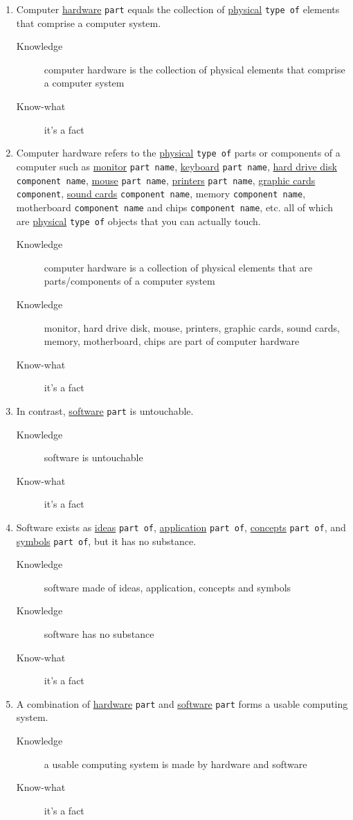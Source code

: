 \documentclass[a4paper,10pt,twoside,twocolumn]{article}
\begin{document}
\begin{enumerate}
\item Computer \uline{hardware} \texttt{part} equals the collection of \uline{physical} \texttt{type of} elements that comprise a computer system.
\begin{description}
\item[{Knowledge}] computer hardware is the collection of physical elements that comprise a computer system
\item[{Know-what}] it's a fact
\end{description}
\item Computer hardware refers to the \uline{physical} \texttt{type of} parts or components of a computer such as \uline{monitor} \texttt{part name}, \uline{keyboard} \texttt{part name}, \uline{hard drive disk} \texttt{component name}, \uline{mouse} \texttt{part name}, \uline{printers} \texttt{part name}, \uline{graphic cards} \texttt{component}, \uline{sound cards} \texttt{component name}, memory \texttt{component name}, motherboard \texttt{component name} and chips \texttt{component name}, etc. all of which are \uline{physical} \texttt{type of} objects that you can actually touch.
\begin{description}
\item[{Knowledge}] computer hardware is a collection of physical elements that are parts/components of a computer system
\item[{Knowledge}] monitor, hard drive disk, mouse, printers, graphic cards, sound cards, memory, motherboard, chips are part of computer hardware
\item[{Know-what}] it's a fact
\end{description}
\item In contrast, \uline{software} \texttt{part} is untouchable.
\begin{description}
\item[{Knowledge}] software is untouchable
\item[{Know-what}] it's a fact
\end{description}
\item Software exists as \uline{ideas} \texttt{part of}, \uline{application} \texttt{part of}, \uline{concepts} \texttt{part of}, and \uline{symbols} \texttt{part of}, but it has no substance.
\begin{description}
\item[{Knowledge}] software made of ideas, application, concepts and symbols
\item[{Knowledge}] software has no substance
\item[{Know-what}] it's a fact
\end{description}
\item A combination of \uline{hardware} \texttt{part} and \uline{software} \texttt{part} forms a usable computing system.
\begin{description}
\item[{Knowledge}] a usable computing system is made by hardware and software
\item[{Know-what}] it's a fact
\end{description}
\end{enumerate}
\end{document}
